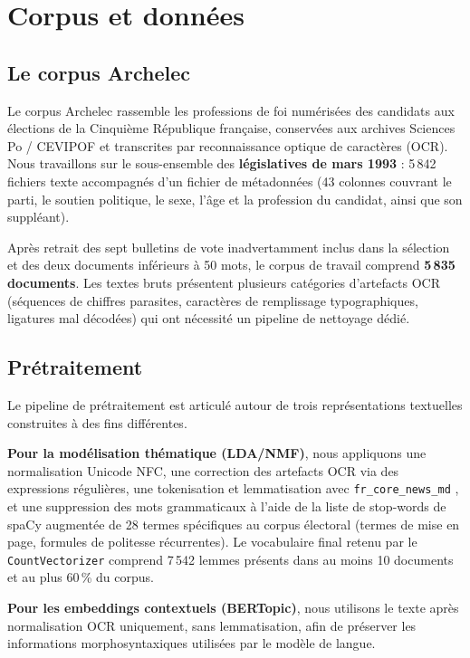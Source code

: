 \documentclass{article}
\begin{document}
\section{Corpus et données}
\label{sec:data}

\subsection{Le corpus Archelec}

Le corpus Archelec \citep{archelec} rassemble les professions de foi numérisées
des candidats aux élections de la Cinquième République française, conservées
aux archives Sciences Po / CEVIPOF et transcrites par reconnaissance optique
de caractères (OCR). Nous travaillons sur le sous-ensemble des \textbf{législatives
de mars 1993} : 5\,842 fichiers texte accompagnés d'un fichier de métadonnées
(43 colonnes couvrant le parti, le soutien politique, le sexe, l'âge et la
profession du candidat, ainsi que son suppléant).

Après retrait des sept bulletins de vote inadvertamment inclus dans la sélection
et des deux documents inférieurs à 50 mots, le corpus de travail comprend
\textbf{5\,835 documents}. Les textes bruts présentent plusieurs catégories
d'artefacts OCR (séquences de chiffres parasites, caractères de remplissage
typographiques, ligatures mal décodées) qui ont nécessité un pipeline de
nettoyage dédié.

\subsection{Prétraitement}
\label{sec:preproc}

Le pipeline de prétraitement est articulé autour de trois représentations
textuelles construites à des fins différentes.

\textbf{Pour la modélisation thématique (LDA/NMF)}, nous appliquons une
normalisation Unicode NFC, une correction des artefacts OCR via des expressions
régulières, une tokenisation et lemmatisation avec \texttt{fr\_core\_news\_md}
\citep{spacy}, et une suppression des mots grammaticaux à l'aide de la liste
de stop-words de spaCy augmentée de 28 termes spécifiques au corpus électoral
(termes de mise en page, formules de politesse récurrentes). Le vocabulaire
final retenu par le \texttt{CountVectorizer} comprend 7\,542 lemmes présents
dans au moins 10 documents et au plus 60\,\% du corpus.

\textbf{Pour les embeddings contextuels (BERTopic)}, nous utilisons le texte
après normalisation OCR uniquement, sans lemmatisation, afin de préserver les
informations morphosyntaxiques utilisées par le modèle de langue.
\end{document}
